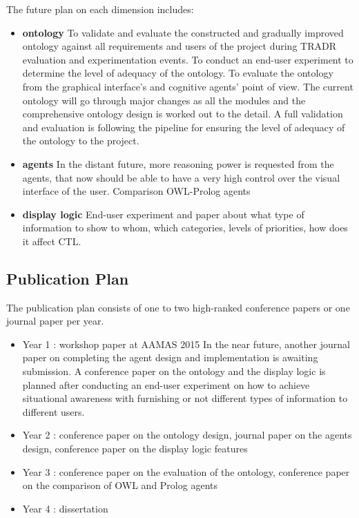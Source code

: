 The future plan on each dimension includes:
\begin{itemize}
\item \textbf{ontology}  To validate and evaluate the constructed and gradually improved ontology against all requirements and users of the project during TRADR evaluation and experimentation events. To conduct an end-user experiment to determine the level of adequacy of the ontology. To evaluate the ontology from the graphical interface's and cognitive agents' point of view.  
The current ontology will go through major changes as all the modules and the comprehensive ontology design is worked out to the detail. A full validation and evaluation is following the pipeline for ensuring the level of adequacy of the ontology to the project.
\item \textbf{agents} In the distant future, more reasoning power is requested from the agents, that now should be able to have a very high control over the visual interface of the user. 
Comparison OWL-Prolog agents
\item \textbf{display logic} End-user experiment and paper about what type of information to show to whom, which categories, levels of priorities, how does it affect CTL.
\end{itemize}

\subsection{Publication Plan}

The publication plan consists of one to two high-ranked conference papers or one journal paper per year. 
\begin{itemize}
\item Year 1 : workshop paper at AAMAS 2015
In the near future, another journal paper on completing the agent design and implementation is awaiting submission. A conference paper on the ontology and the display logic is planned after conducting an end-user experiment on how to achieve situational awareness with furnishing or not different types of information to different users.
\item Year 2 : conference paper on the ontology design, journal paper on the agents design, conference paper on the display logic features
\item Year 3 : conference paper on the evaluation of the ontology, conference paper on the comparison of OWL and Prolog agents
\item Year 4 : dissertation 
\end{itemize}

